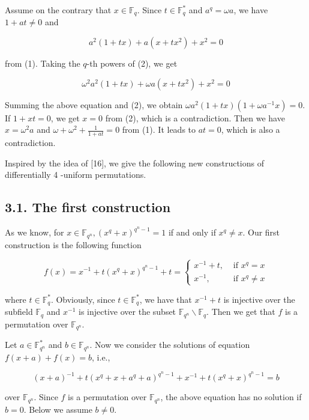 \documentclass[10pt]{article}
\begin{document}
Assume on the contrary that $x \in \mathbb{F}_{q}$. Since $t \in \mathbb{F}_{q}^{*}$ and $a^{q}=\omega a$, we have $1+a t \neq 0$ and


\begin{equation*}
a^{2}(1+t x)+a\left(x+t x^{2}\right)+x^{2}=0 \tag{2}
\end{equation*}


from (1). Taking the $q$-th powers of (2), we get

$$
\omega^{2} a^{2}(1+t x)+\omega a\left(x+t x^{2}\right)+x^{2}=0
$$

Summing the above equation and (2), we obtain $\omega a^{2}(1+t x)\left(1+\omega a^{-1} x\right)=0$. If $1+x t=0$, we get $x=0$ from (2), which is a contradiction. Then we have $x=\omega^{2} a$ and $\omega+\omega^{2}+\frac{1}{1+a t}=0$ from (1). It leads to $a t=0$, which is also a contradiction.

Inspired by the idea of [16], we give the following new constructions of differentially 4 -uniform permutations.

\subsection*{3.1. The first construction}
As we know, for $x \in \mathbb{F}_{q^{n}},\left(x^{q}+x\right)^{q^{n}-1}=1$ if and only if $x^{q} \neq x$. Our first construction is the following function

\[
f(x)=x^{-1}+t\left(x^{q}+x\right)^{q^{n}-1}+t= \begin{cases}x^{-1}+t, & \text { if } x^{q}=x  \tag{3}\\ x^{-1}, & \text { if } x^{q} \neq x\end{cases}
\]

where $t \in \mathbb{F}_{q}^{*}$. Obviously, since $t \in \mathbb{F}_{q}^{*}$, we have that $x^{-1}+t$ is injective over the subfield $\mathbb{F}_{q}$ and $x^{-1}$ is injective over the subset $\mathbb{F}_{q^{n}} \backslash \mathbb{F}_{q}$. Then we get that $f$ is a permutation over $\mathbb{F}_{q^{n}}$.

Let $a \in \mathbb{F}_{q^{n}}^{*}$ and $b \in \mathbb{F}_{q^{n}}$. Now we consider the solutions of equation $f(x+a)+f(x)=b$, i.e.,


\begin{equation*}
(x+a)^{-1}+t\left(x^{q}+x+a^{q}+a\right)^{q^{n}-1}+x^{-1}+t\left(x^{q}+x\right)^{q^{n}-1}=b \tag{4}
\end{equation*}


over $\mathbb{F}_{q^{n}}$. Since $f$ is a permutation over $\mathbb{F}_{q^{n}}$, the above equation has no solution if $b=0$. Below we assume $b \neq 0$.
\end{document}
